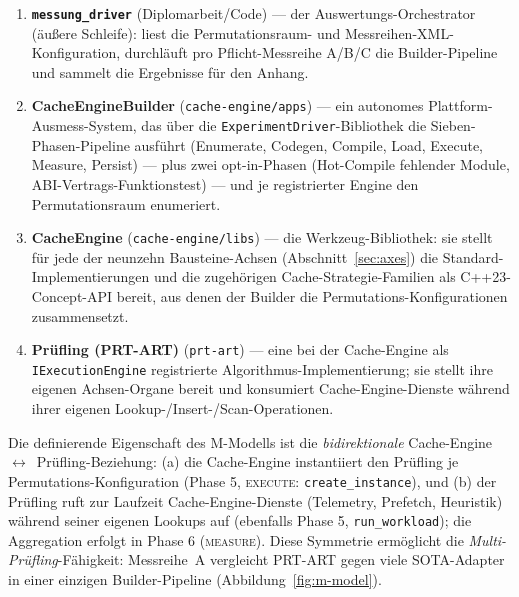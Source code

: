 \begin{enumerate}
  \item \textbf{\texttt{messung\_driver}} (Diplomarbeit/Code) --- der Auswertungs-Orchestrator
  (äußere Schleife): liest die Permutationsraum- und Messreihen-XML-Konfiguration, durchläuft pro
  Pflicht-Messreihe A/B/C die Builder-Pipeline und sammelt die Ergebnisse für den Anhang.
  \item \textbf{CacheEngineBuilder} (\texttt{cache-engine/apps}) --- ein autonomes
  Plattform-Ausmess-System, das über die \texttt{ExperimentDriver}-Bibliothek die
  Sieben-Phasen-Pipeline ausführt (Enumerate, Codegen, Compile, Load, Execute, Measure, Persist) ---
  plus zwei opt-in-Phasen (Hot-Compile fehlender Module, ABI-Vertrags-Funktionstest) --- und je
  registrierter Engine den Permutationsraum enumeriert.
  \item \textbf{CacheEngine} (\texttt{cache-engine/libs}) --- die Werkzeug-Bibliothek: sie stellt
  für jede der neunzehn Bausteine-Achsen (Abschnitt~\ref{sec:axes}) die Standard-Implementierungen
  und die zugehörigen Cache-Strategie-Familien als C++23-Concept-API bereit, aus denen der Builder
  die Permutations-Konfigurationen zusammensetzt.
  \item \textbf{Prüfling (PRT-ART)} (\texttt{prt-art}) --- eine bei der Cache-Engine als
  \texttt{IExecutionEngine} registrierte Algorithmus-Implementierung; sie stellt ihre eigenen
  Achsen-Organe bereit und konsumiert Cache-Engine-Dienste während ihrer eigenen
  Lookup-/Insert-/Scan-Operationen.
\end{enumerate}

Die definierende Eigenschaft des M-Modells ist die \emph{bidirektionale}
Cache-Engine~$\leftrightarrow$~Prüfling-Beziehung: (a) die Cache-Engine instantiiert den Prüfling je
Permutations-Konfiguration (Phase 5, \textsc{execute}: \texttt{create\_instance}), und (b) der
Prüfling ruft zur Laufzeit Cache-Engine-Dienste (Telemetry, Prefetch, Heuristik) während seiner
eigenen Lookups auf (ebenfalls Phase 5, \texttt{run\_workload}); die Aggregation erfolgt in Phase 6
(\textsc{measure}). Diese Symmetrie ermöglicht die \emph{Multi-Prüfling}-Fähigkeit: Messreihe~A
vergleicht PRT-ART gegen viele SOTA-Adapter in einer einzigen Builder-Pipeline
(Abbildung~\ref{fig:m-model}).

